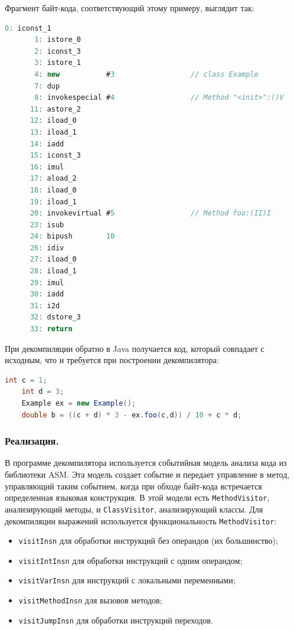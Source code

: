 Фрагмент байт-кода, соответствующий этому примеру, выглядит так:

\begin{lstlisting}[language = JAVA]
       0: iconst_1
       1: istore_0
       2: iconst_3
       3: istore_1
       4: new           #3                  // class Example
       7: dup
       8: invokespecial #4                  // Method "<init>":()V
      11: astore_2
      12: iload_0
      13: iload_1
      14: iadd
      15: iconst_3
      16: imul
      17: aload_2
      18: iload_0
      19: iload_1
      20: invokevirtual #5                  // Method foo:(II)I
      23: isub
      24: bipush        10
      26: idiv
      27: iload_0
      28: iload_1
      29: imul
      30: iadd
      31: i2d
      32: dstore_3
      33: return
\end{lstlisting}

При декомпиляции обратно в Java получается код, который совпадает с исходным, что и требуется при построении декомпилятора:

\begin{lstlisting}[language = JAVA]
	int c = 1; 
	int d = 3; 
	Example ex = new Example();
	double b = ((c + d) * 3 - ex.foo(c,d)) / 10 + c * d; 
\end{lstlisting} 

\subsubsection{Реализация.}

В программе декомпилятора используется событийная модель анализа кода из библиотеки ASM. Эта модель создает событие и передает управление в метод, управляющий таким событием, когда при обходе байт-кода встречается определенная языковая конструкция. В этой модели есть \texttt{MethodVisitor}, анализирующий методы, и \texttt{ClassVisitor}, анализирующий классы. Для декомпиляции выражений используется функциональность \texttt{MethodVisitor}:
\begin{itemize}
\item \texttt{visitInsn} для обработки инструкций без операндов (их большинство);
\item \texttt{visitIntInsn} для обработки инструкций с одним операндом;
\item \texttt{visitVarInsn} для инструкций с локальными переменными;
\item \texttt{visitMethodInsn} для вызовов методов;
\item \texttt{visitJumpInsn} для обработки инструкций переходов.
\end{itemize}

